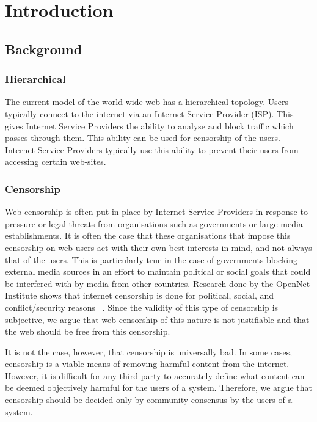 \chapter{Introduction}

\section{Background}

\subsection{Hierarchical}

The current model of the world-wide web has a hierarchical topology. Users typically
connect to the internet via an Internet Service Provider (ISP).
This gives Internet Service Providers the ability to analyse and block traffic which
passes through them. This ability can be used for censorship of the users.
Internet Service Providers typically use this ability to prevent their users from
accessing certain web-sites.

\subsection{Censorship}

Web censorship is often put in place by Internet Service Providers in response
to pressure or legal threats from organisations such as governments or large media establishments.
It is often the case that these organisations that impose this censorship on web
users act with their own best interests in mind, and not always that of the users. This is
particularly true in the case of governments blocking external media sources in
an effort to maintain political or social goals that could be interfered with
by media from other countries. Research done by the OpenNet Institute
shows that internet censorship is done for political, social, and conflict/security
reasons ~\cite{opennet}. Since the validity of this type of censorship is subjective, we argue that
web censorship of this nature is not justifiable and that the web should be free
from this censorship.

It is not the case, however, that censorship is universally bad. In some cases,
censorship is a viable means of removing harmful content from the internet.
However, it is difficult for any third party to accurately define what content
can be deemed objectively harmful for the users of a system. Therefore, we argue
that censorship should be decided only by community consensus by the users of a system.

